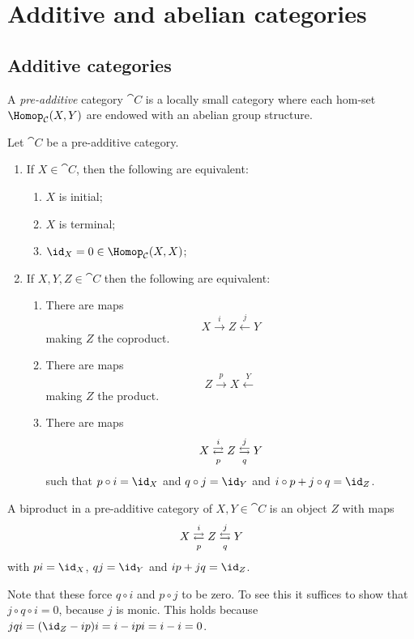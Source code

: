 \documentclass[../main.tex]{subfiles}
\begin{document}
\chapter{Additive and abelian categories}
\section{Additive categories}
\begin{defn}
	A \emph{pre-additive} category $\cat C$ is a locally small category where each hom-set $\Hom_{\cat C}(X, Y)$ are endowed with an abelian group structure.
\end{defn}
\begin{lem}\label{lem:pre-additive-categories-are-nice}
Let $\cat C$ be a pre-additive category.
\begin{enumerate}
	\item If $X \in \cat C$, then the following are equivalent:
	\begin{enumerate}
    	\item $X$ is initial;
        \item $X$ is terminal;
        \item $\id_X = 0 \in \Hom_{\cat C}(X,X)$;
    \end{enumerate}
	\item If $X, Y, Z \in \cat C$ then the following are equivalent:
	\begin{enumerate}
    	\item There are maps \[X \xrightarrow{i} Z \xleftarrow{j} Y\] making $Z$ the coproduct.
    	\item There are maps \[Z \xrightarrow{p} X \xleftarrow Y\] making $Z$ the product.
		\item There are maps \[X \xrightleftarrows{i}[p] Z \xleftrightarrows{j}[q] Y\] such that $p \circ i = \id_X$ and $q \circ j = \id_Y$ and $i\circ p + j \circ q = \id_Z$.
    \end{enumerate}

\end{enumerate}

\end{lem}

\begin{defn}
	A biproduct in a pre-additive category of $X, Y \in \cat C$ is an object $Z$ with maps \[X \xrightleftarrows{i}[p] Z \xleftrightarrows{j}[q] Y\] with $pi = \id_X$, $qj = \id_Y$ and $ip + jq = \id_Z$.
\end{defn}
\begin{rmk}
	Note that these force $q \circ i$ and $p \circ j$ to be zero. To see this it suffices to show that $j \circ q \circ i = 0$, because $j$ is monic.
	This holds because $jqi = (\id_Z - ip)i = i - ipi = i - i = 0$.
\end{rmk}
\end{document}
